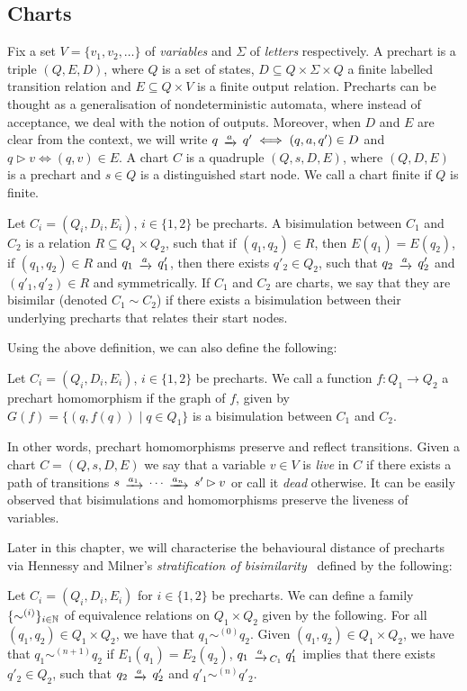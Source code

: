 \subsection{Charts}
Fix a set $V=\{v_1, v_2, \dots\}$ of \emph{variables} and $\Sigma$ of \emph{letters} respectively. A prechart is a triple $(Q,E,D)$, where $Q$ is a set of states, $D \subseteq Q \times \Sigma \times Q$ a finite labelled transition relation and $E \subseteq Q \times V$ is a finite output relation. Precharts can be thought as a generalisation of nondeterministic automata, where instead of acceptance, we deal with the notion of outputs. Moreover, when $D$ and $E$ are clear from the context, we will write $q \tr{a} q' \iff (q,a,q') \in D$ and $q \rhd v \iff (q,v) \in E$. A chart $C$ is a quadruple $(Q, s, D, E)$, where $(Q,D,E)$ is a prechart and $s \in Q$ is a distinguished start node. We call a chart finite if $Q$ is finite.
\begin{definition}
	Let $C_i = (Q_i,D_i,E_i)$, $i \in \{1,2\}$ be precharts. A bisimulation between $C_1$ and $C_2$ is a relation ${R} \subseteq Q_1 \times Q_2$, such that  if $(q_1,q_2)\in R$, then $E(q_1)=E(q_2)$,  if $(q_1,q_2) \in R$ and $q_1 \tr{a} q'_1$, then there exists $q'_2 \in Q_2$, such that $q_2 \tr{a} q'_2$ and $(q'_1, q'_2) \in R$ and symmetrically. If $C_1$ and $C_2$ are charts, we say that they are bisimilar (denoted $C_1 \sim C_2$) if there exists a bisimulation between their underlying precharts that relates their start nodes.
\end{definition}
Using the above definition, we can also define the following:
\begin{definition}
	 Let $C_i = (Q_i,D_i,E_i)$, $i \in \{1,2\}$ be precharts. We call a function $f \colon Q_1 \to Q_2$ a prechart homomorphism if the graph of $f$, given by $G(f) = \{(q,f(q)) \mid q \in Q_1\}$ is a bisimulation between $C_1$ and $C_2$.
\end{definition}
In other words, prechart homomorphisms preserve and reflect transitions. Given a chart $C=(Q,s,D,E)$ we say that a variable $v \in V$ is \emph{live} in $C$ if there exists a path of transitions $s \tr{a_1} \dots \tr{a_n} s' \rhd v$ or call it \emph{dead} otherwise. It can be easily observed that bisimulations and homomorphisms preserve the liveness of variables.

Later in this chapter, we will characterise the behavioural distance of precharts via Hennessy and Milner's \emph{stratification of bisimilarity}~\cite{hennessy:1985:algebraic} defined by the following:
	\begin{definition}
	Let $C_i = (Q_i, D_i, E_i)$ for $i \in \{1,2\}$ be precharts. We can define a family $\{\sim^{(i)} \}_{i \in \mathbb{N}}$ of equivalence relations on $Q_1 \times Q_2$ given by the following. For all $(q_1,q_2) \in Q_1 \times Q_2$, we have that $q_1 \sim^{(0)} q_2$. Given $(q_1, q_2) \in Q_1 \times Q_2$, we have that $q_1 \sim ^{(n+1)} q_2$ if  $E_1(q_1) = E_2(q_2)$,  $q_1 \tr{a}_{C_1} q'_1$ implies that there exists $q'_2 \in Q_2$, such that $q_2 \tr{a} q'_2$ and $q'_1 \sim^{(n)} q'_2$.
\end{definition}

